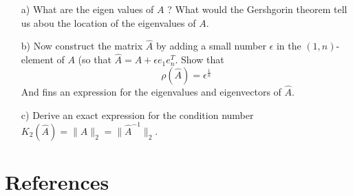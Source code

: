 \documentclass{article}
\theoremstyle{remark}
\begin{document}
\begin{enumerate}
  \item [a)] What are the eigen values of $A$ ? What would the Gershgorin theorem tell us abou the location of the eigenvalues of $A$.
  \item [b)] Now construct the matrix $\hat{A}$ by adding a small number $\epsilon $ in the $\left( 1, n \right)$- element of $A$ (so that $\hat{A} = A  +  \epsilon e_{1} e_{n}^{T} $. Show that \[
      \rho \left( \hat{A} \right) = \epsilon ^{\frac{1}{n} }
  \] 
  And fins an expression for the eigenvalues and eigenvectors of $\hat{A}$. 
\item[c)] Derive an exact expression for the condition number $K_{2} \left( \hat{A} \right) =  \|\hat{A}\|_{2}^{} = \|\hat{A}^{-1}\|_{2}^{}$.
\end{enumerate}



\newpage
\section{References}%
\label{sec:references}



\end{document}
